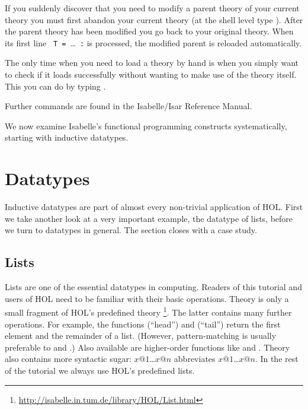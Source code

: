 \begin{description}
  If you suddenly discover that you need to modify a parent theory of your
  current theory you must first abandon your current theory (at the shell
  level type ). After the parent theory has
  been modified you go back to your original theory. When its first line
  \texttt{~T~=}~\dots~\texttt{:} is processed, the
  modified parent is reloaded automatically.
  
  The only time when you need to load a theory by hand is when you simply
  want to check if it loads successfully without wanting to make use of the
  theory itself. This you can do by typing
  .
\end{description}
Further commands are found in the Isabelle/Isar Reference Manual.

We now examine Isabelle's functional programming constructs systematically,
starting with inductive datatypes.


\section{Datatypes}
\label{sec:datatype}

Inductive datatypes are part of almost every non-trivial application of HOL.
First we take another look at a very important example, the datatype of
lists, before we turn to datatypes in general. The section closes with a
case study.


\subsection{Lists}

Lists are one of the essential datatypes in computing. Readers of this
tutorial and users of HOL need to be familiar with their basic operations.
Theory  is only a small fragment of HOL's predefined theory
\footnote{\url{http://isabelle.in.tum.de/library/HOL/List.html}}.
The latter contains many further operations. For example, the functions
 (``head'') and  (``tail'') return the first
element and the remainder of a list. (However, pattern-matching is usually
preferable to  and .)  
Also available are higher-order functions like  and .
Theory  also contains
more syntactic sugar: \isa{[}$x@1$\isa{,}\dots\isa{,}$x@n$\isa{]} abbreviates
$x@1$\isa{\#}\dots\isa{\#}$x@n$\isa{\#[]}.  In the rest of the tutorial we
always use HOL's predefined lists.


